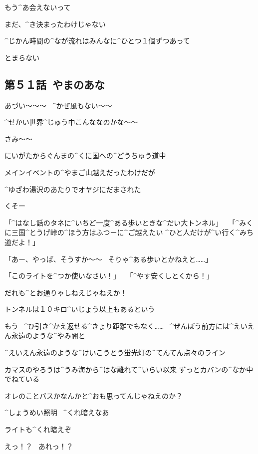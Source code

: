 \Takahiro もう^{あ}{会}えないって

\Takahiro まだ、^{き}{決}まったわけじゃない

\page[104]
\Alpha ^{じかん}{時間}の^{なが}{流}れはみんなに^{ひとつ}{１個}ずつあって

\Alpha とまらない


\subsection{第５１話\ やまのあな}

\page[107]
\Alpha あづい〜〜〜
\ ^{かぜ}{風}もない〜〜

\Alpha ^{せかい}{世界}^{じゅう}{中}こんななのかな〜〜

\page[108]
\Ayase さみ〜〜

\Ayase にいがたからぐんまの^{くに}{国}への^{どうちゅう}{道中}

\Ayase メインイベントの^{やまご}{山越}えだったわけだが

\Ayase ^{ゆざわ}{湯沢}のあたりでオヤジにだまされた

\Ayase くそー

\page[109]
\Person 「^{はなし}{話}のタネに^{いちど}{一度}^{ある}{歩}いときな^{だい}{大}トンネル」
\ 「^{みくに}{三国}^{とうげ}{峠}の^{ほう}{方}はふつーに^{ご}{越}えたい
  ^{ひと}{人}だけが^{い}{行}く^{みち}{道}だよ！」

\Ayase 「あー、やっぱ、そうすか〜〜
  \ そりゃ^{ある}{歩}いとかねえと……」

\Person 「このライトを^{つか}{使}いなさい！」
\ 「^{やす}{安}くしとくから！」

\page[110]
\Ayase だれも^{とお}{通}りゃしねえじゃねえか！

\Ayase トンネルは１０キロ^{いじょう}{以上}もあるという

\Ayase もう
\ ^{ひ}{引}き^{かえ}{返}せる^{きょり}{距離}でもなく……
\ ^{ぜんぽう}{前方}には^{えいえん}{永遠}のような^{やみ}{闇}と

\Ayase ^{えいえん}{永遠}のような^{けいこうとう}{蛍光灯}の^{てんてん}{点々}のライン

\page[111]
\Ayase カマスのやろうは^{うみ}{海}から^{はな}{離}れて^{いらい}{以来}
ずっとカバンの^{なか}{中}でねている

\Ayase オレのことバスかなんかと^{おも}{思}ってんじゃねえのか？

\Ayase ^{しょうめい}{照明}
\ ^{くれ}{暗}えなあ

\page[112]
\Ayase ライトも^{くれ}{暗}えぞ

\Ayase えっ！？
\ あれっ！？

